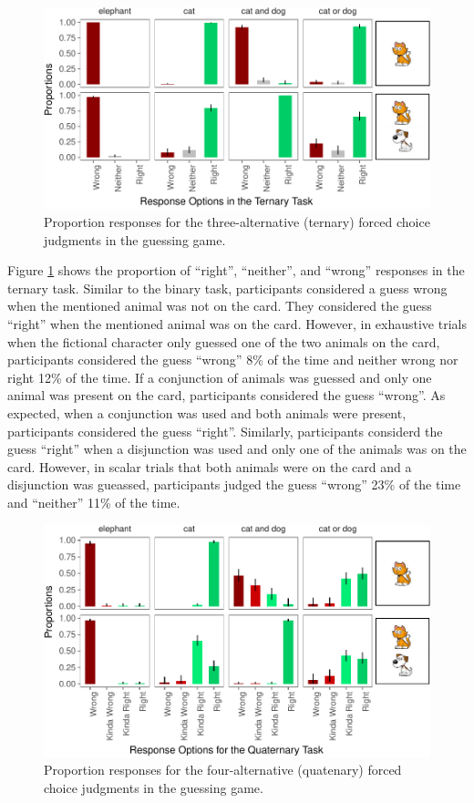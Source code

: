 \documentclass[floatsintext,man]{apa6}
\theoremstyle{definition}
\theoremstyle{definition}
\theoremstyle{definition}
\theoremstyle{remark}
\begin{document}
\begin{figure}
\centering
\includegraphics{writeup_files/figure-latex/ternaryPlot-1.pdf}
\caption{\label{fig:ternaryPlot}Proportion responses for the
three-alternative (ternary) forced choice judgments in the guessing
game.}
\end{figure}

Figure \ref{fig:ternaryPlot} shows the proportion of \enquote{right},
\enquote{neither}, and \enquote{wrong} responses in the ternary task.
Similar to the binary task, participants considered a guess wrong when
the mentioned animal was not on the card. They considered the guess
\enquote{right} when the mentioned animal was on the card. However, in
exhaustive trials when the fictional character only guessed one of the
two animals on the card, participants considered the guess
\enquote{wrong} 8\% of the time and neither wrong nor right 12\% of the
time. If a conjunction of animals was guessed and only one animal was
present on the card, participants considered the guess \enquote{wrong}.
As expected, when a conjunction was used and both animals were present,
participants considered the guess \enquote{right}. Similarly,
participants considerd the guess \enquote{right} when a disjunction was
used and only one of the animals was on the card. However, in scalar
trials that both animals were on the card and a disjunction was
gueassed, participants judged the guess \enquote{wrong} 23\% of the time
and \enquote{neither} 11\% of the time.

\begin{figure}
\centering
\includegraphics{writeup_files/figure-latex/quaternaryPlot-1.pdf}
\caption{\label{fig:quaternaryPlot}Proportion responses for the
four-alternative (quatenary) forced choice judgments in the guessing
game.}
\end{figure}
\end{document}
